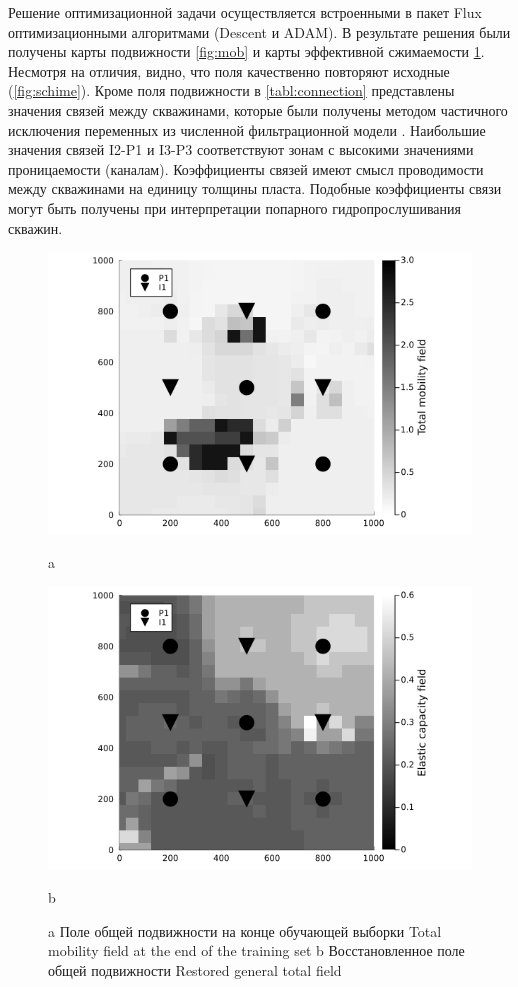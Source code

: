 \documentclass{article}
\begin{document}
Решение оптимизационной задачи осуществляется встроенными в пакет Flux оптимизационными алгоритмами (Descent и ADAM). В результате решения были получены карты подвижности \ref{fig:mob} и карты эффективной сжимаемости \ref{comp}. Несмотря на отличия, видно, что поля качественно повторяют исходные (\ref{fig:schime}). Кроме поля подвижности в \ref{tabl:connection} представлены значения связей между скважинами, которые были получены методом частичного исключения переменных из численной фильтрационной модели \cite{and}. Наибольшие значения связей I2-P1 и I3-P3 соответствуют зонам с высокими значениями проницаемости (каналам). Коэффициенты связей имеют смысл проводимости между скважинами на единицу толщины пласта. Подобные коэффициенты связи могут быть получены при интерпретации попарного гидропрослушивания скважин.

\begin{figure}
	\centering
	\begin{minipage}{0.5\linewidth}
		\includegraphics[width=1\textwidth]{fig4}
		\caption{a}
		\label{fig:mob}
	\end{minipage}%
	\begin{minipage}{0.5\linewidth}
		\centering
		\includegraphics[width=1\textwidth]{fig5}
		\caption{b}
		\label{comp}
	\end{minipage}
	\caption{a Поле общей подвижности на конце обучающей выборки Total mobility field at the end of the training set
	b Восстановленное поле общей подвижности Restored general total field}
\end{figure}
\end{document}
